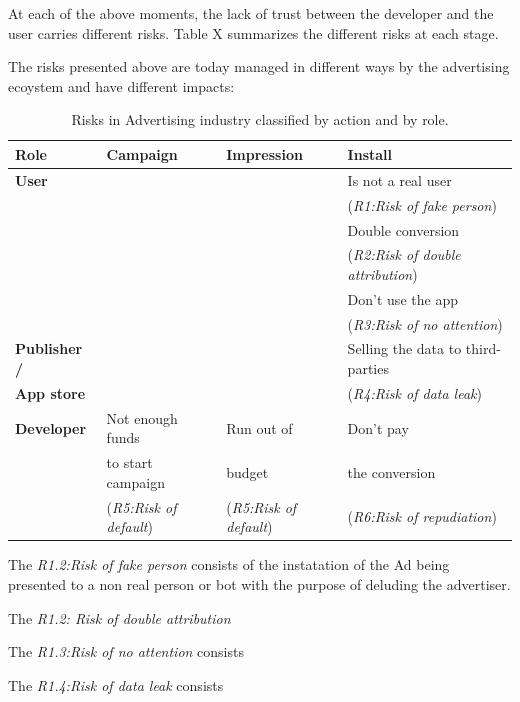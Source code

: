 
At each of the above moments, the lack of trust between the developer and the user carries different risks. Table X summarizes the different risks at each stage.


The risks presented above are today managed in different ways by the advertising ecoystem and have different impacts:

\begin{table}[h]
\centering
\begin{tabular}{|l||l|l|l|} \hline
{\bf Role} & {\bf Campaign} & {\bf Impression}  & {\bf Install} \\ \hline
{\bf User} & & & Is not a real user \\ 
 & & & ({\em R1:Risk of fake person}) \\ 
 & & & Double conversion  \\
 & & & ({\em R2:Risk of double attribution}) \\
 & & & Don't use the app  \\
 & & & ({\em R3:Risk of no attention}) \\  \hline
{\bf Publisher  /}  & & & Selling the data to third-parties \\ 
{\bf App store} & & & ({\em R4:Risk of data leak})\\ \hline
{\bf Developer} & Not enough funds & Run out of & Don't pay \\  
 & to start campaign & budget & the conversion \\  
  & ({\em R5:Risk of default}) & ({\em R5:Risk of default}) & ({\em R6:Risk of repudiation}) \\  
\hline\end{tabular}
\caption{Risks in Advertising industry classified by action and by role.}
\label{tab:risks}
\end{table}


The {\em R1.2:Risk of fake person} consists of the instatation of the Ad being presented to a non real person or bot with the purpose of deluding the advertiser.

\medskip

The {\em R1.2: Risk of double attribution} 

\medskip

The {\em R1.3:Risk of no attention}  consists

\medskip

The {\em R1.4:Risk of data leak} consists

